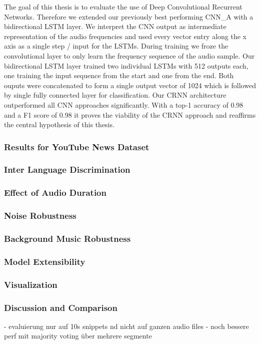 The goal of this thesis is to evaluate the use of Deep Convolutional Recurrent Networks. Therefore we extended our previously best performing CNN\_A with a bidirectional LSTM layer. We interpret the CNN output as intermediate representation of the audio frequencies and used every vector entry along the x axis as a single step / input for the LSTMs. During training we froze the convolutional layer to only learn the frequency sequence of the audio sample. Our bidirectional LSTM layer trained two individual LSTMs with 512 outputs each, one training the input sequence from the start and one from the end. Both ouputs were concatenated to form a single output vector of 1024 which is followed by single fully connected layer for classification.
Our CRNN architecture outperformed all CNN approaches significantly. With a top-1 accuracy of 0.98 and a F1 score of 0.98 it proves the viability of the CRNN approach and reaffirms the central hypothesis of this thesis.



\subsubsection{Results for YouTube News Dataset}
\label{sec:results_news}

\subsubsection{Inter Language Discrimination} 
\label{sec:lang_discrimination}
\subsubsection{Effect of Audio Duration} 
\label{sec:duration}
\subsubsection{Noise Robustness} 
\label{sec:noise_robustness}
\subsubsection{Background Music Robustness} 
\label{sec:music_robustness}
\subsubsection{Model Extensibility} 
\label{sec:extensibility}
\subsubsection{Visualization} 
\label{sec:visualization}

\subsubsection{Discussion and Comparison} 
\label{sec:comparison}

- evaluierung nur auf 10s snippets nd nicht auf ganzen audio files
- noch bessere perf mit majority voting über mehrere segmente
